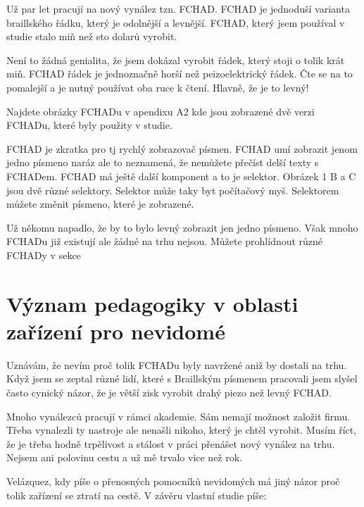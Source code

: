 Už par let pracují na nový vynález tzn. FCHAD. FCHAD je jednoduší varianta braillského řádku, který je odolnější a levnější.  FCHAD, který jsem používal v studie stalo miň než sto dolarů vyrobit.

Není to žádná genialita, že jsem dokázal vyrobit řádek, který stoji o tolik krát miň.  FCHAD řádek je jednoznačně horší než peizoelektrický řádek.  Čte se na to pomalejší a je nutný používat oba ruce k čtení.  Hlavně, že je to levný!

Najdete obrázky FCHADu v apendixu A2 kde jsou zobrazené dvě verzi FCHADu, které byly použity v studie.

FCHAD je zkratka pro  tj rychlý zobrazovač písmen.  FCHAD umí zobrazit jenom jedno písmeno naráz ale to neznamená, že nemůžete přečíst delší texty s FCHADem.  FCHAD má ještě další komponent a to je selektor.  Obrázek 1 B a C jsou dvě různé selektory.  Selektor může taky byt počítačový myš.  Selektorem můžete změnit písmeno, které je zobrazené.

Už někomu napadlo, že by to bylo levný zobrazit jen jedno písmeno. Však mnoho FCHADu již existují ale žádné na trhu nejsou.  Můžete prohlídnout různé FCHADy v sekce 

\section{Význam pedagogiky v oblasti zařízení pro nevidomé}

Uznávám, že nevím proč tolik FCHADu byly navržené aniž by dostali na trhu.  Když jsem se zeptal různé lidí, které s Braillským písmenem pracovali jsem slyšel často cynický názor, že je větší zisk vyrobit drahý piezo než levný FCHAD.

Mnoho vynálezců pracují v rámci akademie. Sám nemají možnost založit firmu. Třeba vynalezli ty nastroje ale nenašli nikoho, který je chtěl vyrobit. Musím říct, že je třeba hodně trpělivost a stálost v práci přenášet nový vynález na trhu.  Nejsem ani polovinu cestu a už mě trvalo vice než rok.

Velázquez, kdy píše o přenosných pomocníků nevidomých má jiný názor proč tolik zařízení se ztratí na cestě.  V závěru vlastní studie píše:
\em
{}\em \citep{velazquez2010wearable}%

